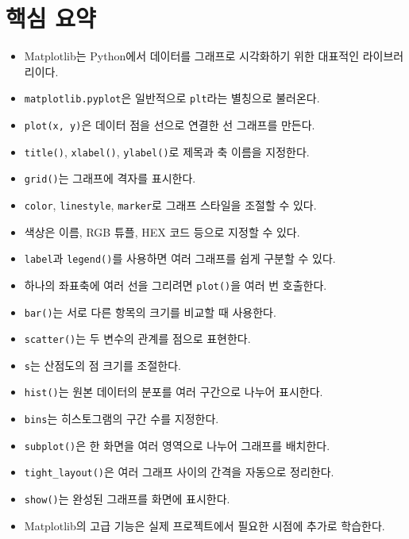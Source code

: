 \documentclass[11pt,a4paper]{article}
\begin{document}
\section{핵심 요약}

\begin{itemize}[leftmargin=1.5em]
    \item Matplotlib는 Python에서 데이터를 그래프로 시각화하기 위한 대표적인 라이브러리이다.
    \item \texttt{matplotlib.pyplot}은 일반적으로 \texttt{plt}라는 별칭으로 불러온다.
    \item \texttt{plot(x, y)}은 데이터 점을 선으로 연결한 선 그래프를 만든다.
    \item \texttt{title()}, \texttt{xlabel()}, \texttt{ylabel()}로 제목과 축 이름을 지정한다.
    \item \texttt{grid()}는 그래프에 격자를 표시한다.
    \item \texttt{color}, \texttt{linestyle}, \texttt{marker}로 그래프 스타일을 조절할 수 있다.
    \item 색상은 이름, RGB 튜플, HEX 코드 등으로 지정할 수 있다.
    \item \texttt{label}과 \texttt{legend()}를 사용하면 여러 그래프를 쉽게 구분할 수 있다.
    \item 하나의 좌표축에 여러 선을 그리려면 \texttt{plot()}을 여러 번 호출한다.
    \item \texttt{bar()}는 서로 다른 항목의 크기를 비교할 때 사용한다.
    \item \texttt{scatter()}는 두 변수의 관계를 점으로 표현한다.
    \item \texttt{s}는 산점도의 점 크기를 조절한다.
    \item \texttt{hist()}는 원본 데이터의 분포를 여러 구간으로 나누어 표시한다.
    \item \texttt{bins}는 히스토그램의 구간 수를 지정한다.
    \item \texttt{subplot()}은 한 화면을 여러 영역으로 나누어 그래프를 배치한다.
    \item \texttt{tight\_layout()}은 여러 그래프 사이의 간격을 자동으로 정리한다.
    \item \texttt{show()}는 완성된 그래프를 화면에 표시한다.
    \item Matplotlib의 고급 기능은 실제 프로젝트에서 필요한 시점에 추가로 학습한다.
\end{itemize}
\end{document}
